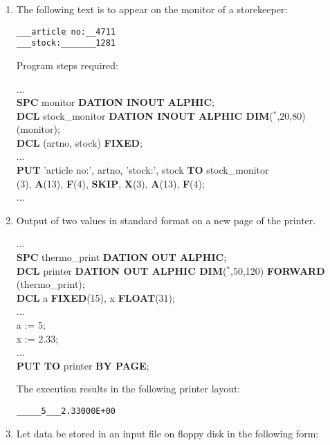 \begin{enumerate}
\item The following text is to appear on the monitor of a storekeeper:

\begin{verbatim}
___article no:__4711
___stock:_______1281
\end{verbatim}

Program steps required:

...\\
{\bf SPC} monitor {\bf DATION INOUT ALPHIC};\\
{\bf DCL} stock\_monitor {\bf DATION INOUT ALPHIC DIM}($^*$,20,80)\\
 (monitor);\\
{\bf DCL} (artno, stock) {\bf FIXED};\\
...\\
{\bf PUT} 'article no:', artno, 'stock:', stock {\bf TO} stock\_monitor\\
(3), {\bf A}(13), {\bf F}(4), {\bf SKIP}, {\bf X}(3), {\bf A}(13), {\bf F}(4);\\
...

\item Output of two values in standard format on a new page of the
printer.

...\\
{\bf SPC} thermo\_print {\bf DATION OUT ALPHIC};\\
{\bf DCL} printer {\bf DATION OUT ALPHIC DIM}($^*$,50,120) {\bf FORWARD}\\
 (thermo\_print);\\
{\bf DCL} a {\bf FIXED}(15), x {\bf FLOAT}(31);\\
...\\
a := 5;\\
x := 2.33;\\
...\\
{\bf PUT TO} printer {\bf BY PAGE};\\

The execution results in the following printer layout:

\begin{verbatim}
_____5___2.33000E+00
\end{verbatim}
\item Let data be stored in an input file on floppy disk in the
following form:


\end{enumerate}
